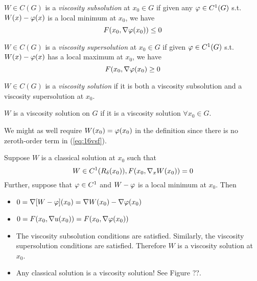 \begin{definition}
$W\in C(G)$ is a \textit{viscosity subsolution} at $x_0\in G$ if given any $\varphi\in C^1(G)$ s.t. $W(x)-\varphi(x)$ is a local minimum at $x_0$, we have
$$F(x_0,\nabla\varphi(x_0))\leq0$$
\end{definition}

\begin{definition}
$W\in C(G)$ is a \textit{viscosity supersolution} at $x_0\in G$ if given $\varphi\in C^1(G)$ s.t. $W(x)-\varphi(x)$ has a local maximum at $x_0$, we have
$$F(x_0,\nabla\varphi(x_0)\geq0$$
\end{definition}

\begin{definition}
$W\in C(G)$ is a \textit{viscosity solution} if it is both a viscosity subsolution and a viscosity supersolution at $x_0$.
\end{definition}

\begin{definition}
$W$ is a viscosity solution on $G$ if it is a viscosity solution $\forall x_0\in G$.
\end{definition}

\begin{remark}
We might as well require $W(x_0)=\varphi(x_0)$ in the definition since there is no zeroth-order term in (\ref{eq:16vsf}).
\end{remark}

\begin{remark}
Suppose $W$ is a classical solution at $x_0$ such that
$$W\in C^1(R_\delta(x_0)), F(x_0,\nabla_xW(x_0))=0$$
Further, suppose that $\varphi\in C^1$ and $W-\varphi$ is a local minimum at $x_0$. Then
\begin{itemize}
\item $0 = \nabla[W-\varphi](x_0) = \nabla W(x_0)-\nabla\varphi(x_0)$
\item $0 = F(x_0,\nabla u(x_0)) = F(x_0,\nabla\varphi(x_0))$
\item The viscosity subsolution conditions are satisfied. Similarly, the viscosity supersolution conditions are satisfied. Therefore $W$ is a viscosity solution at $x_0$.
\item Any classical solution is a viscosity solution! See Figure ??.
\end{itemize}
\end{remark}

